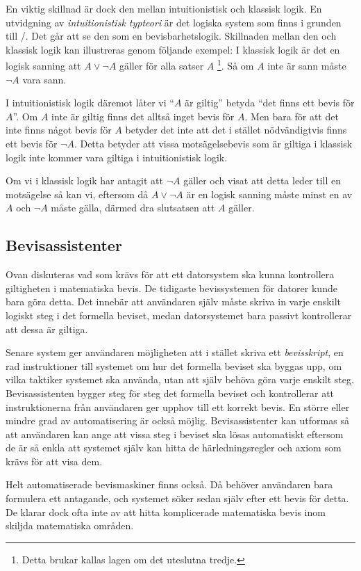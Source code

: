 En viktig skillnad är dock den mellan intuitionistisk och klassisk logik. En
utvidgning av \emph{intuitionistisk typteori}\cite{martin1984intuitionistic} är
det logiska system som finns i grunden till
\coq/\ssr\cite{bertot2004interactive}. Det går att se den som en
bevisbarhetslogik. Skillnaden mellan den och klassisk logik kan illustreras
genom följande exempel: I klassisk logik är det en logisk sanning att $A \lor
\neg A$ gäller för alla satser $A$ \footnote{Detta brukar kallas lagen om det
uteslutna tredje.}. Så om $A$ inte är sann måste $\neg A$ vara
sann\cite{bennet2004forsta}.

I intuitionistisk logik däremot låter vi ``$A$ är giltig'' betyda ``det finns
ett bevis för $A$''. Om $A$ inte är giltig finns det alltså inget bevis för
$A$. Men bara för att det inte finns något bevis för $A$ betyder det inte att
det i stället nödvändigtvis finns ett bevis för $\neg A$. Detta betyder att
vissa motsägelsebevis som är giltiga i klassisk logik inte kommer vara giltiga
i intuitionistisk logik\cite{barendregt2001proofdependent}.

Om vi i klassisk logik har antagit att $\neg A$ gäller och visat att detta
leder till en motsägelse så kan vi, eftersom då $A \lor \neg A$ är en logisk
sanning måste minst en av $A$ och $\neg A$ måste gälla, därmed dra slutsatsen
att $A$ gäller.

\subsection{Bevisassistenter}
Ovan diskuteras vad som krävs för att ett datorsystem ska kunna kontrollera
giltigheten i matematiska bevis. De tidigaste bevissystemen för datorer kunde
bara göra detta. Det innebär att användaren själv måste skriva in varje enskilt
logiskt steg i det formella beviset, medan datorsystemet bara passivt
kontrollerar att dessa är giltiga.

Senare system ger användaren möjligheten att i stället skriva ett
\emph{bevisskript}, en rad instruktioner till systemet om hur det formella
beviset ska byggas upp, om vilka taktiker systemet ska använda, utan att själv
behöva göra varje enskilt steg. Bevisassistenten bygger steg för steg det
formella beviset och kontrollerar att instruktionerna från användaren ger
upphov till ett korrekt bevis. En större eller mindre grad av automatisering är
också möjlig. Bevisassistenter kan utformas så att användaren kan ange att
vissa steg i beviset ska lösas automatiskt eftersom de är så enkla att
systemet själv kan hitta de härledningsregler och axiom som krävs för att visa
dem.

Helt automatiserade bevismaskiner finns också. Då behöver användaren bara
formulera ett antagande, och systemet söker sedan själv efter ett bevis för
detta. De klarar dock ofta inte av att hitta komplicerade matematiska bevis
inom skiljda matematiska områden\cite{proofassistants}.
